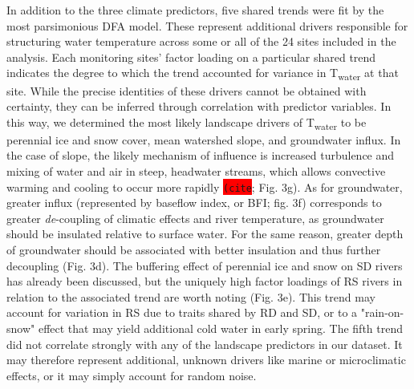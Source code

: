 \documentclass[notitlepage]{article}
\begin{document}
In addition to the three climate predictors, five shared trends were fit by the most parsimonious DFA model. These represent additional drivers responsible for structuring water temperature across some or all of the 24 sites included in the analysis. Each monitoring sites' factor loading on a particular shared trend indicates the degree to which the trend accounted for variance in T\textsubscript{water} at that site. While the precise identities of these drivers cannot be obtained with certainty, they can be inferred through correlation with predictor variables. In this way, we determined the most likely landscape drivers of T\textsubscript{water} to be perennial ice and snow cover, mean watershed slope, and groundwater influx. In the case of slope, the likely mechanism of influence is increased turbulence and mixing of water and air in steep, headwater streams, which allows convective warming and cooling to occur more rapidly \colorbox{red}{\lstinline{(cite}}; Fig. 3g). As for groundwater, greater influx (represented by baseflow index, or BFI; fig. 3f) corresponds to greater {\it de}-coupling of climatic effects and river temperature, as groundwater should be insulated relative to surface water. For the same reason, greater depth of groundwater should be associated with better insulation and thus further decoupling (Fig. 3d). The buffering effect of perennial ice and snow on SD rivers has already been discussed, but the uniquely high factor loadings of RS rivers in relation to the associated trend are worth noting (Fig. 3e). This trend may account for variation in RS due to traits shared by RD and SD, or to a "rain-on-snow" effect that may yield additional cold water in early spring. The fifth trend did not correlate strongly with any of the landscape predictors in our dataset. It may therefore represent additional, unknown drivers like marine or microclimatic effects, or it may simply account for random noise.
\end{document}
